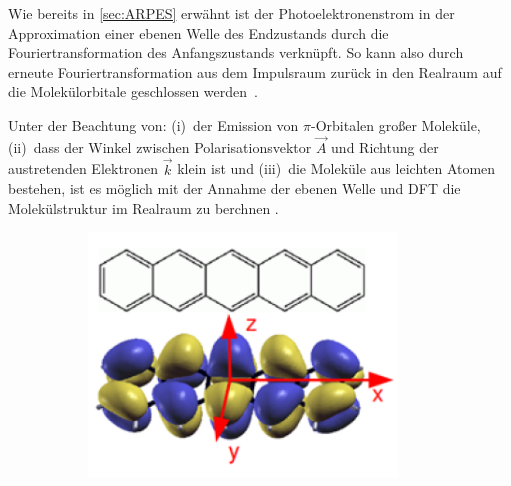         Wie bereits in \autoref{sec:ARPES} erwähnt ist der Photoelektronenstrom in der Approximation einer ebenen Welle des Endzustands durch die Fouriertransformation des Anfangszustands verknüpft.
        So kann also durch erneute Fouriertransformation aus dem Impulsraum zurück in den Realraum auf die Molekülorbitale geschlossen werden~\cite{MM_2}.

        Unter der Beachtung von: (i)~der Emission von $\pi$-Orbitalen großer Moleküle, (ii)~dass der Winkel zwischen Polarisationsvektor $\vec{A}$ und Richtung der austretenden Elektronen $\vec{k}$ klein ist und (iii)~die Moleküle aus leichten Atomen bestehen, ist es möglich mit der Annahme der ebenen Welle und DFT die Molekülstruktur im Realraum zu berchnen \cite{MM_2}.
        \begin{figure}
            \centering
            \begin{subfigure}{0.3\textwidth}
                \centering
                \includegraphics[width=0.9\textwidth]{DFT1.PNG}
                \caption{}
                \label{fig:DFT1}
            \end{subfigure}
            \begin{subfigure}{0.3\textwidth}
                \centering

\end{subfigure}
\end{figure}

